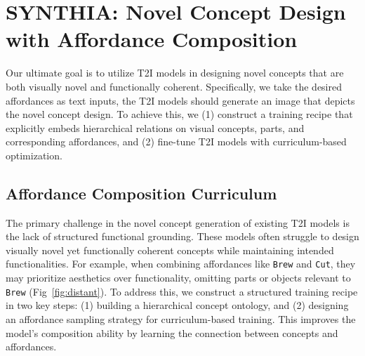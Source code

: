 \section{\textsc{SYNTHIA}: Novel Concept Design with Affordance Composition}
Our ultimate goal is to utilize T2I models in designing novel concepts that are both visually novel and functionally coherent. Specifically, we take the desired affordances as text inputs, the T2I models should generate an image that depicts the novel concept design.
To achieve this, we (1) construct a training recipe that explicitly embeds hierarchical relations on visual concepts, parts, and corresponding affordances, and (2) fine-tune T2I models with curriculum-based optimization.

\subsection{Affordance Composition Curriculum}
\label{sec:data_gen}
The primary challenge in the novel concept generation of existing T2I models is the lack of structured functional grounding. These models often struggle to design visually novel yet functionally coherent concepts while maintaining intended functionalities. For example, when combining affordances like \texttt{Brew} and \texttt{Cut}, they may prioritize aesthetics over functionality, omitting parts or objects relevant to \texttt{Brew} (Fig~\ref{fig:distant}). To address this, we construct a structured training recipe in two key steps: (1) building a hierarchical concept ontology, and (2) designing an affordance sampling strategy for curriculum-based training. This improves the model's composition ability by learning the connection between concepts and affordances.

